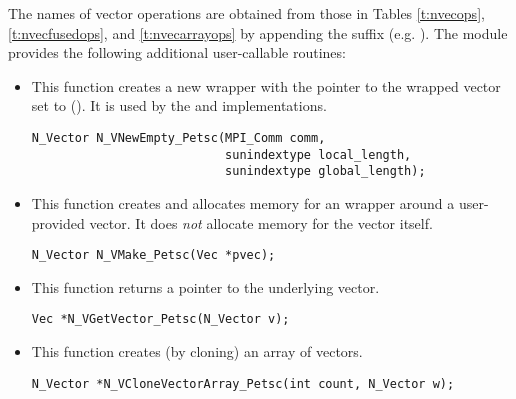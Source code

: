 The names of vector operations are obtained from those in 
Tables \ref{t:nvecops}, \ref{t:nvecfusedops}, and \ref{t:nvecarrayops} by appending the
suffix  (e.g. ).
The module {\nvecpetsc}  provides the following additional user-callable routines:
\begin{itemize}

  

\item {}
 
  This function creates a new {\nvector} wrapper with the pointer to
  the wrapped {\petsc} vector set to (). It is used by the 
   and  implementations. 

\begin{verbatim}
N_Vector N_VNewEmpty_Petsc(MPI_Comm comm, 
                           sunindextype local_length, 
                           sunindextype global_length);
\end{verbatim}

  

\item {}
  
  This function creates and allocates memory for an {\nvecpetsc}
  wrapper around a user-provided {\petsc} vector. It does {\em not} 
  allocate memory for the vector  itself.

\begin{verbatim}
N_Vector N_VMake_Petsc(Vec *pvec);
\end{verbatim}


\item {}
  
  This function returns a pointer to the underlying {\petsc} vector.

\begin{verbatim}
Vec *N_VGetVector_Petsc(N_Vector v);
\end{verbatim}



\item {}
 
  This function creates (by cloning) an array of  {\nvecpetsc} vectors.
 
\begin{verbatim}
N_Vector *N_VCloneVectorArray_Petsc(int count, N_Vector w);
\end{verbatim}


\end{itemize}
